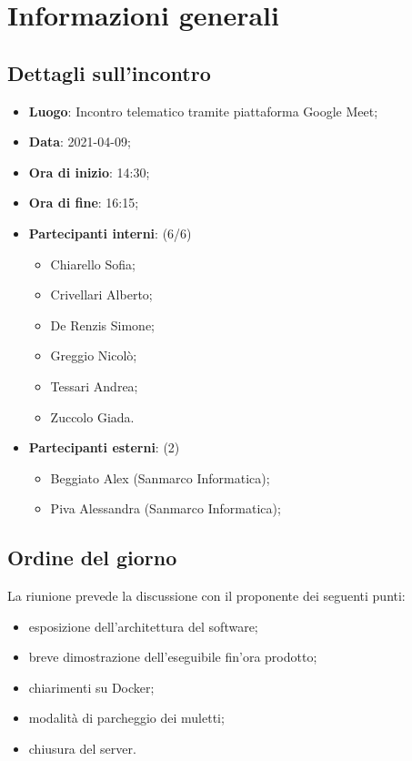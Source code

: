 \section{Informazioni generali}

\subsection{Dettagli sull'incontro}
\begin{itemize}
\item \textbf{Luogo}: Incontro telematico tramite piattaforma Google Meet;
\item \textbf{Data}: 2021-04-09;
\item \textbf{Ora di inizio}: 14:30;
\item \textbf{Ora di fine}: 16:15;
\item \textbf{Partecipanti interni}: (6/6)
\begin{itemize}
	\item Chiarello Sofia;
	\item Crivellari Alberto;
	\item De Renzis Simone;
	\item Greggio Nicolò;
	\item Tessari Andrea;
	\item Zuccolo Giada.
\end{itemize}
\item \textbf{Partecipanti esterni}: (2)
\begin{itemize}
	\item Beggiato Alex (Sanmarco Informatica);
	\item Piva Alessandra (Sanmarco Informatica);
\end{itemize}
\end{itemize}

\subsection{Ordine del giorno}

La riunione prevede la discussione con il proponente dei seguenti punti:
\begin{itemize}
	\item esposizione dell'architettura del software;
	\item breve dimostrazione dell'eseguibile fin'ora prodotto;
	\item chiarimenti su Docker;
	\item modalità di parcheggio dei muletti;
	\item chiusura del server.	
\end{itemize}




